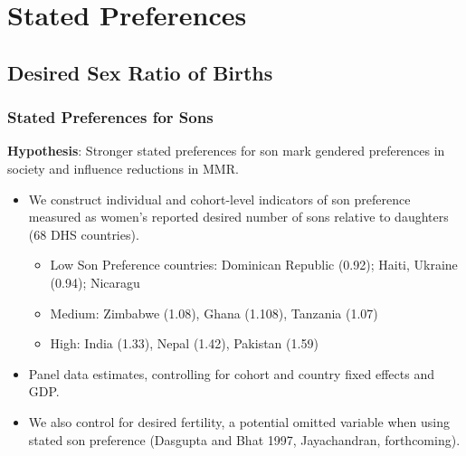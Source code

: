 \documentclass[9pt,letterpaper,subeqn]{beamer}
\begin{document}
\section{Stated Preferences}


\subsection{Desired Sex Ratio of Births}

\begin{frame}
\frametitle{Stated Preferences for Sons}
\textbf{Hypothesis}: Stronger stated preferences for son mark gendered preferences in society and influence reductions in MMR.
\vspace{3mm}
\begin{itemize}
\setlength{\itemsep}{15pt}
\item We construct individual and cohort-level indicators of son preference measured as women's reported desired number of sons relative to daughters (68 DHS countries).

\begin{itemize}
\item Low Son Preference countries: Dominican Republic (0.92); Haiti, Ukraine (0.94); Nicaragu%
\item Medium: Zimbabwe (1.08), Ghana (1.108), Tanzania (1.07) 
\item High: India (1.33), Nepal (1.42), Pakistan (1.59)
\end{itemize}
\item Panel data estimates, controlling for cohort and country fixed effects and GDP. 
\item We also control for desired fertility, a potential omitted variable when using stated son preference (Dasgupta and Bhat 1997, Jayachandran, forthcoming).
\end{itemize}
\end{frame}
\end{document}

